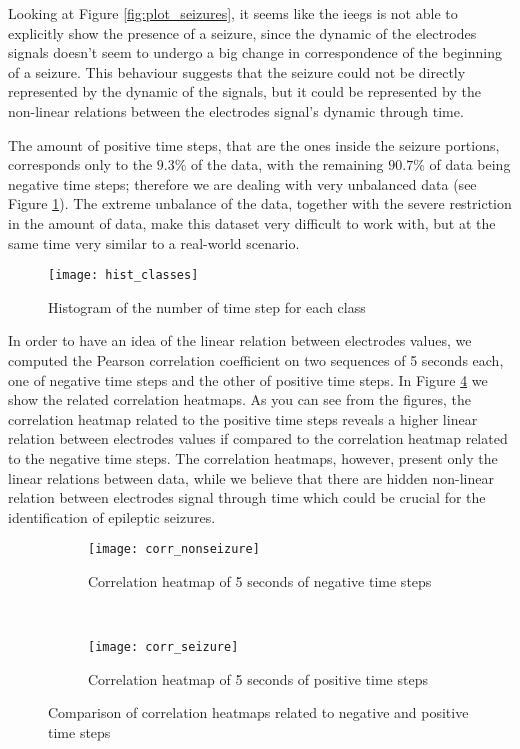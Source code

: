 Looking at Figure \ref{fig:plot_seizures}, it seems like the \acsp{ieeg} is not able to explicitly show the presence of a seizure, since the dynamic of the electrodes signals doesn't seem to undergo a big change in correspondence of the beginning of a seizure. This behaviour suggests that the seizure could not be directly represented by the dynamic of the signals, but it could be represented by the non-linear relations between the electrodes signal's dynamic through time.

The amount of positive time steps, that are the ones inside the seizure portions, corresponds only to the $9.3$\% of the data, with the remaining $90.7$\% of data being negative time steps; therefore we are dealing with very unbalanced data (see Figure \ref{fig:hist_classes}). The extreme unbalance of the data, together with the severe restriction in the amount of data, make this dataset very difficult to work with, but at the same time very similar to a real-world scenario.
\begin{figure}[htbp]
    \centering
    \texttt{[image: hist\_classes]}
    \caption{Histogram of the number of time step for each class}
    \label{fig:hist_classes}
\end{figure}

In order to have an idea of the linear relation between electrodes values, we computed the Pearson correlation coefficient on two sequences of 5 seconds each, one of negative time steps and the other of positive time steps. In Figure \ref{fig:corr_heatmaps} we show the related correlation heatmaps. As you can see from the figures, the correlation heatmap related to the positive time steps reveals a higher linear relation between electrodes values if compared to the correlation heatmap related to the negative time steps. The correlation heatmaps, however, present only the linear relations between data, while we believe that there are hidden non-linear relation between electrodes signal through time which could be crucial for the identification of epileptic seizures.

\begin{figure}[htbp]
    \centering
    \begin{subfigure}[t]{0.5\textwidth}
		\texttt{[image: corr\_nonseizure]}
        \caption{Correlation heatmap of 5 seconds of negative time steps}
        \label{fig:corr_nonseizure}
	\end{subfigure}%
	~
	\begin{subfigure}[t]{0.5\textwidth}
		\texttt{[image: corr\_seizure]}
        \caption{Correlation heatmap of 5 seconds of positive time steps}
        \label{fig:corr_seizure}
    \end{subfigure}
    \caption{Comparison of correlation heatmaps related to negative and positive time steps}
    \label{fig:corr_heatmaps}
\end{figure}

